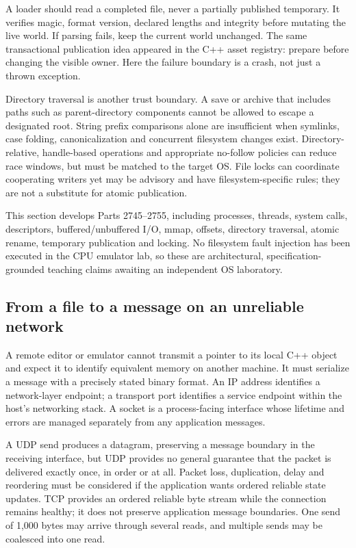 A loader should read a completed file, never a partially published temporary. It verifies magic, format version, declared lengths and integrity before mutating the live world. If parsing fails, keep the current world unchanged. The same transactional publication idea appeared in the C++ asset registry: prepare before changing the visible owner. Here the failure boundary is a crash, not just a thrown exception.

Directory traversal is another trust boundary. A save or archive that includes paths such as parent-directory components cannot be allowed to escape a designated root. String prefix comparisons alone are insufficient when symlinks, case folding, canonicalization and concurrent filesystem changes exist. Directory-relative, handle-based operations and appropriate no-follow policies can reduce race windows, but must be matched to the target OS. File locks can coordinate cooperating writers yet may be advisory and have filesystem-specific rules; they are not a substitute for atomic publication.

This section develops Parts 2745--2755, including processes, threads, system calls, descriptors, buffered/unbuffered I/O, mmap, offsets, directory traversal, atomic rename, temporary publication and locking. No filesystem fault injection has been executed in the CPU emulator lab, so these are architectural, specification-grounded teaching claims awaiting an independent OS laboratory.

\subsection{From a file to a message on an unreliable network}\label{06-engine-ii-ch042-from-a-file-to-a-message-on-an-unreliable-network}

\hypertarget{06-engine-ii-ch042-from-a-file-to-a-message-on-an-unreliable-network}{}

A remote editor or emulator cannot transmit a pointer to its local C++ object and expect it to identify equivalent memory on another machine. It must serialize a message with a precisely stated binary format. An IP address identifies a network-layer endpoint; a transport port identifies a service endpoint within the host's networking stack. A socket is a process-facing interface whose lifetime and errors are managed separately from any application messages.

A UDP send produces a datagram, preserving a message boundary in the receiving interface, but UDP provides no general guarantee that the packet is delivered exactly once, in order or at all. Packet loss, duplication, delay and reordering must be considered if the application wants ordered reliable state updates. TCP provides an ordered reliable byte stream while the connection remains healthy; it does not preserve application message boundaries. One send of 1,000 bytes may arrive through several reads, and multiple sends may be coalesced into one read.

